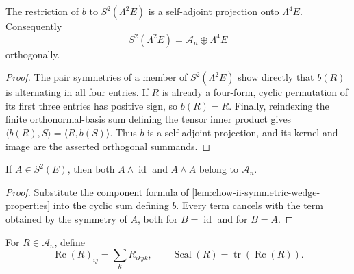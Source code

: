 \begin{lemma}
  \label{lem:chow-ii-bianchi-orthogonal-decomposition}
  The restriction of \(b\) to \(S^2(\Lambda^2E)\) is a self-adjoint
  projection onto \(\Lambda^4E\).  Consequently
  \[
    S^2(\Lambda^2E)=\mathcal A_n\oplus\Lambda^4E
  \]
  orthogonally.
\end{lemma}
\begin{proof}
\sketch
  The pair symmetries of a member of \(S^2(\Lambda^2E)\) show directly that
  \(b(R)\) is alternating in all four entries.  If \(R\) is already a
  four-form, cyclic permutation of its first three entries has positive sign,
  so \(b(R)=R\).  Finally, reindexing the finite orthonormal-basis sum defining
  the tensor inner product gives \(\langle b(R),S\rangle=\langle R,b(S)\rangle\).
  Thus \(b\) is a self-adjoint projection, and its kernel and image are the
  asserted orthogonal summands.
\end{proof}

\begin{lemma}
  \label{lem:chow-ii-wedge-satisfies-bianchi}
  If \(A\in S^2(E)\), then both
  \(A\wedge\operatorname{id}\) and \(A\wedge A\) belong to \(\mathcal A_n\).
\end{lemma}
\begin{proof}
\sketch
  Substitute the component formula of
  \ref{lem:chow-ii-symmetric-wedge-properties} into the cyclic sum defining
  \(b\).  Every term cancels with the term obtained by the symmetry of \(A\),
  both for \(B=\operatorname{id}\) and for \(B=A\).
\end{proof}

\begin{definition}
  \label{def:chow-ii-algebraic-ricci-contraction}
  For \(R\in\mathcal A_n\), define
  \[
    \operatorname{Rc}(R)_{ij}=\sum_kR_{ikjk},
    \qquad \operatorname{Scal}(R)=\operatorname{tr}(\operatorname{Rc}(R)).
  \]
\end{definition}

